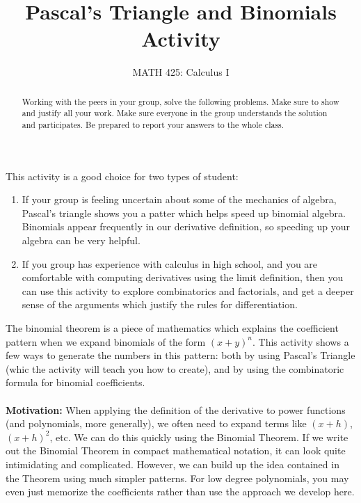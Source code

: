 \documentclass{ximera}
\title{Pascal's Triangle and Binomials Activity}
\author{MATH 425: Calculus I}
\begin{document}
\begin{abstract}
   Working with the peers in your group, solve the following problems. Make sure to show and justify all your work. Make sure everyone in the group understands the solution and participates. Be prepared to report your answers to the whole class. 
\end{abstract}
\maketitle

This activity is a good choice for two types of student: 
\begin{enumerate}
    \item If your group is feeling uncertain about some of the mechanics of algebra, Pascal's triangle shows you a patter which helps speed up binomial algebra.  Binomials appear frequently in our derivative definition, so speeding up your algebra can be very helpful.
    \item If you group has experience with calculus in high school, and you are comfortable with computing derivatives using the limit definition, then you can use this activity to explore combinatorics and factorials, and get a deeper sense of the arguments which justify the rules for differentiation.
\end{enumerate}


 The binomial theorem is a piece of mathematics which explains the coefficient pattern when we expand binomials of the form $(x+y)^n$.  This activity shows a few ways to generate the numbers in this pattern: both by using Pascal's Triangle (whic the activity will teach you how to create), and by using the combinatoric formula for binomial coefficients.\\
 \\
 \textbf{Motivation:} When applying the definition of the derivative to power functions (and polynomials, more generally), we often need to expand terms like $(x+h)$, $(x+h)^2$, etc.  We can do this quickly using the Binomial Theorem.  If we write out the Binomial Theorem in compact mathematical notation, it can look quite intimidating and complicated.  However, we can build up the idea contained in the Theorem using much simpler patterns.  For low degree polynomials, you may even just memorize the coefficients rather than use the approach we develop here.
\end{document}
